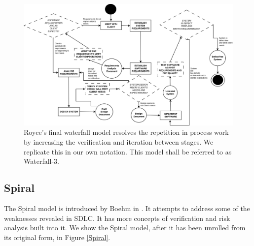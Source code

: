 \begin{figure}
	\centering
	\includegraphics[angle=90,scale=0.3]{media/WaterfallRoyceThree}
	\caption{Royce's final waterfall model resolves the repetition in process work by increasing the
		verification and iteration between stages. We replicate this in our own
      notation. This model shall be referred to as Waterfall-3.}
	\label{waterfallRoyceThree}
\end{figure}

\subsection{Spiral}
The Spiral model is introduced by Boehm in \cite{Boehm:1986:SMS:12944.12948}.
It attempts to address some of the weaknesses revealed in SDLC.
It has more concepts of verification and risk analysis built into it.
We show the Spiral model, after it has been unrolled from its original form, in Figure
\ref{Spiral}.\\
\\

